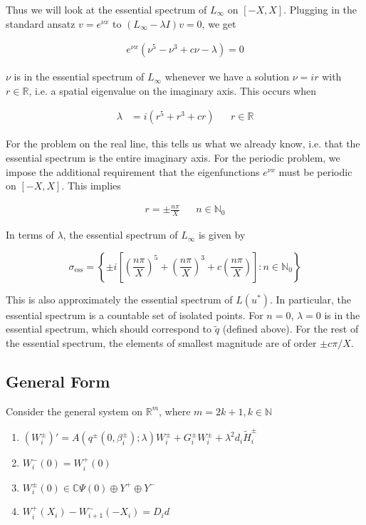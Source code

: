 \documentclass[12pt]{article}
\def\R{{\mathbb R}}
\def\N{{\mathbb N}}
\def\C{{\mathbb C}}
\begin{document}
Thus we will look at the essential spectrum of $L_\infty$ on $[-X, X]$. Plugging in the standard ansatz $v = e^{\nu x}$ to $(L_\infty - \lambda I)v = 0$, we get

\begin{align*}
e^{\nu x}(\nu^5 - \nu^3 + c \nu - \lambda) = 0
\end{align*}

$\nu$ is in the essential spectrum of $L_\infty$ whenever we have a solution $\nu = i r$ with $r \in \R$, i.e. a spatial eigenvalue on the imaginary axis. This occurs when

\begin{align*}
\lambda &= i(r^5 + r^3 + c r) && r \in \R
\end{align*}

For the problem on the real line, this tells us what we already know, i.e. that the essential spectrum is the entire imaginary axis. For the periodic problem, we impose the additional requirement that the eigenfunctions $e^{\nu x}$ must be periodic on $[-X, X]$. This implies 

\begin{align*}
r = \pm \frac{n \pi}{X} && n \in \N_0
\end{align*}

In terms of $\lambda$, the essential spectrum of $L_\infty$ is given by

\begin{equation}
\sigma_{\text{ess}} = \left\{ \pm i \left[ \left(\frac{n \pi}{X}\right)^5 
+ \left(\frac{n \pi}{X}\right)^3 + c \left(\frac{n \pi}{X}\right) \right] : n \in \N_0 \right\}
\end{equation}

This is also approximately the essential spectrum of $L(u^*)$. In particular, the essential spectrum is a countable set of isolated points. For $n = 0$, $\lambda = 0$ is in the essential spectrum, which should correspond to $\tilde{q}$ (defined above). For the rest of the essential spectrum, the elements of smallest magnitude are of order $\pm c \pi / X$.


\subsection{General Form}

Consider the general system on $\R^m$, where $m = 2k + 1, k \in \N$

\begin{enumerate}
\item $(W_i^\pm)' = A(q^\pm(0, \beta_i^\pm); \lambda) W_i^\pm + G_i^\pm W_i^\pm + \lambda^2 d_i \tilde{H}_i^\pm$
\item $W_i^-(0) = W_i^+(0)$
\item $W_i^\pm(0) \in \C \Psi(0) \oplus Y^+ \oplus Y^- $
\item $W_i^+(X_i) - W_{i+1}^-(-X_i) = D_i d$
\end{enumerate}
\end{document}
